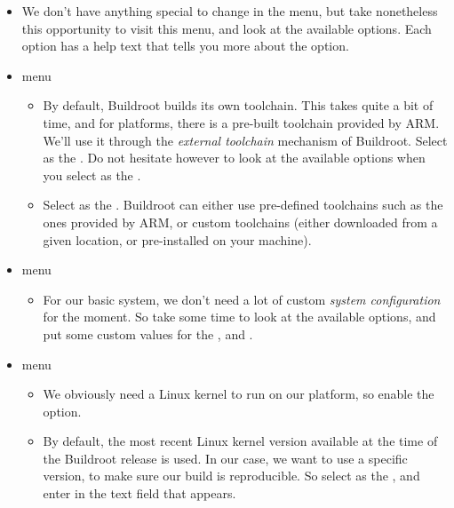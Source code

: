 \begin{itemize}
\item We don't have anything special to change in the
   menu, but take nonetheless this opportunity to
  visit this menu, and look at the available options. Each option has
  a help text that tells you more about the option.

\item {} menu

  \begin{itemize}

  \item By default, Buildroot builds its own toolchain. This takes
    quite a bit of time, and for  platforms, there is a
    pre-built toolchain provided by ARM. We'll use it through the
    {\em external toolchain} mechanism of Buildroot. Select
     as the . Do not
    hesitate however to look at the available options when you select
     as the .

  \item Select  as the
    . Buildroot can either use pre-defined toolchains
    such as the ones provided by ARM, or custom toolchains (either
    downloaded from a given location, or pre-installed on your
    machine).

  \end{itemize}

\item {} menu

  \begin{itemize}

  \item For our basic system, we don't need a lot of custom {\em
      system configuration} for the moment. So take some time to look
    at the available options, and put some custom values for the
    ,  and .

  \end{itemize}

\item {} menu

  \begin{itemize}

  \item We obviously need a Linux kernel to run on our platform, so
    enable the  option.

  \item By default, the most recent Linux kernel version available at
    the time of the Buildroot release is used. In our case, we want to
    use a specific version, to make sure our build is reproducible. So
    select  as the , and
    enter  in the  text field that
    appears.


\end{itemize}
\end{itemize}

